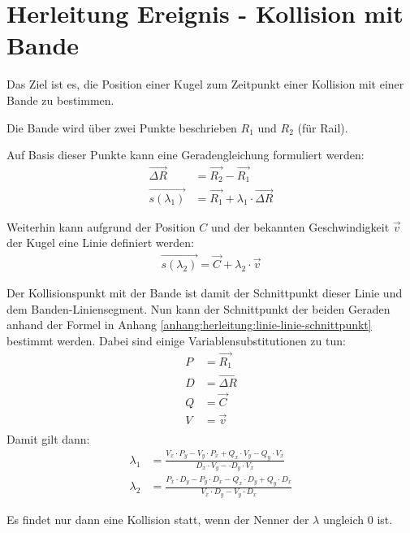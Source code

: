 \section{Herleitung Ereignis - Kollision mit Bande}\label{anhang:herleitung:event:collisionWithRail}
Das Ziel ist es, die Position einer Kugel zum Zeitpunkt einer Kollision mit einer Bande zu bestimmen.

Die Bande wird über zwei Punkte beschrieben $R_1$ und $R_2$ (für Rail).

Auf Basis dieser Punkte kann eine Geradengleichung formuliert werden:
\begin{align}
    \vec{\Delta R} &= \vec{R_2} - \vec{R_1}\\
    \vec{s(\lambda_1)} &= \vec{R_1} + \lambda_1 \cdot \vec{\Delta R}
\end{align}

Weiterhin kann aufgrund der Position $C$ und der bekannten Geschwindigkeit $\vec{v}$ der Kugel eine Linie definiert werden:
\begin{align}
    \vec{s(\lambda_2)} = \vec{C} + \lambda_2 \cdot \vec{v}\label{eq:event_rail_collision:line_equation_ball}
\end{align}

Der Kollisionspunkt mit der Bande ist damit der Schnittpunkt dieser Linie und dem Banden-Liniensegment.
Nun kann der Schnittpunkt der beiden Geraden anhand der Formel in Anhang \ref{anhang:herleitung:linie-linie-schnittpunkt} bestimmt werden.
Dabei sind einige Variablensubstitutionen zu tun:
\begin{align}
    P &= \vec{R_1}\\
    D &= \vec{\Delta R}\\
    Q &= \vec{C}\\
    V &= \vec{v}\\
\end{align}
Damit gilt dann:
\begin{align}
    \lambda_1 &= \frac{V_x \cdot P_y - V_y \cdot P_x + Q_x \cdot V_y - Q_y \cdot V_x}{D_x \cdot V_y - \cdot D_y \cdot V_x}\\
    \lambda_2 &= \frac{P_x \cdot D_y - P_y \cdot D_x - Q_x \cdot D_y + Q_y \cdot D_x}{V_x \cdot D_y - V_y \cdot D_x}
\end{align}
\iffalse %
Nach der Variablensubstitution gilt:
\begin{align}
    \lambda_1 &= \frac{\vec{v}_x \cdot \vec{R_1}_y - \vec{v}_y \cdot \vec{R_1}_x + \vec{C}_x \cdot \vec{v}_y - \vec{C}_y \cdot \vec{v}_x}{\vec{\Delta R}_x \cdot \vec{v}_y - \cdot \vec{\Delta R}_y \cdot \vec{v}_x}\\
    \lambda_2 &= \frac{\vec{R_1}_x \cdot \vec{\Delta R}_y - \vec{R_1}_y \cdot \vec{\Delta R}_x - \vec{C}_x \cdot \vec{\Delta R}_y + \vec{C}_y \cdot \vec{\Delta R}D_x}{\vec{v}_x \cdot \vec{\Delta R_y - \vec{v}_y \cdot \vec{\Delta R}_x}
\end{align}
\fi
Es findet nur dann eine Kollision statt, wenn der Nenner der $\lambda$ ungleich $0$ ist.


